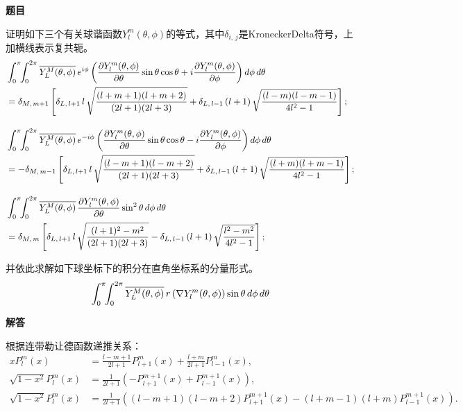 \documentclass{article}
\begin{document}
	\begin{center}
		\large{\textbf{题目}}
	\end{center}
	\medskip
	证明如下三个有关球谐函数$Y_{l}^{m}(\theta, \phi)$的等式，其中$\delta_{i,\, j}$是KroneckerDelta符号，上加横线表示复共轭。
	\begin{align*}
		&\int_0^\pi \!\! \int_0^{2\pi}
		\overline{Y_{L}^{M}(\theta, \phi)}\,
		e^{i\phi}
		\left(
		\pdv{Y_{l}^{m}(\theta, \phi)}{\theta} \sin\theta \cos\theta +
		i \pdv{Y_{l}^{m}(\theta, \phi)}{\phi}
		\right)
		 d\phi\, d\theta \\
		&= \delta_{M,\, m+1}
		\left[
		\delta_{L,\, l+1}\, l\, \sqrt{\frac{(l + m + 1)(l + m + 2)}{(2l + 1)(2l + 3)}}
		+ \delta_{L,\, l-1}\, (l + 1)\, \sqrt{\frac{(l - m)(l - m - 1)}{4l^2 - 1}}
		\right];
		\\[1em]
		&\int_0^\pi \!\! \int_0^{2\pi}
		\overline{Y_{L}^{M}(\theta, \phi)}\,
		e^{-i\phi}
		\left(
		\pdv{Y_{l}^{m}(\theta, \phi)}{\theta} \sin\theta \cos\theta -
		i \pdv{Y_{l}^{m}(\theta, \phi)}{\phi}
		\right)
		 d\phi\, d\theta \\
		&= -\delta_{M,\, m-1}
		\left[
		\delta_{L,\, l+1}\, l\, \sqrt{\frac{(l - m + 1)(l - m + 2)}{(2l + 1)(2l + 3)}}
		+ \delta_{L,\, l-1}\, (l + 1)\, \sqrt{\frac{(l + m)(l + m - 1)}{4l^2 - 1}}
		\right];
		\\[1em]
		&\int_0^\pi \!\! \int_0^{2\pi}
		\overline{Y_{L}^{M}(\theta, \phi)}\,
		\pdv{Y_{l}^{m}(\theta, \phi)}{\theta}
		\sin^2\theta\, d\phi\, d\theta \\
		&= \delta_{M,\, m}
		\left[
		\delta_{L,\, l+1}\, l\, \sqrt{\frac{(l + 1)^2 - m^2}{(2l + 1)(2l + 3)}}
		- \delta_{L,\, l-1}\, (l + 1)\, \sqrt{\frac{l^2 - m^2}{4l^2 - 1}}
		\right];
	\end{align*}
	
	并依此求解如下球坐标下的积分在直角坐标系的分量形式。
	\[
	\int_0^\pi \!\! \int_0^{2\pi}
	\overline{Y_{L}^{M}(\theta, \phi)}\,
	r\,(\nabla{Y_{l}^{m}(\theta, \phi)})\sin\theta\, d\phi\, d\theta \\
	\]
	\bigskip
	\begin{center}
		\large{\textbf{解答}}
	\end{center}
	\medskip
	根据连带勒让德函数递推关系：
	\begin{align*}
		x P_l^m(x) &= \frac{l - m + 1}{2l + 1} P_{l + 1}^m(x) + \frac{l + m}{2l + 1} P_{l - 1}^m(x), \\
		\sqrt{1 - x^2}P_l^m(x) &= \frac{1}{2l + 1}\left(-P_{l + 1}^{m + 1}(x) + P_{l - 1}^{m + 1}(x)\right), \\
		\sqrt{1 - x^2}P_l^m(x) &= \frac{1}{2l + 1}\left((l - m + 1)(l - m + 2)P_{l + 1}^{m + 1}(x) - (l + m - 1)(l + m)P_{l - 1}^{m + 1}(x)\right).
	\end{align*}
	
\end{document}
